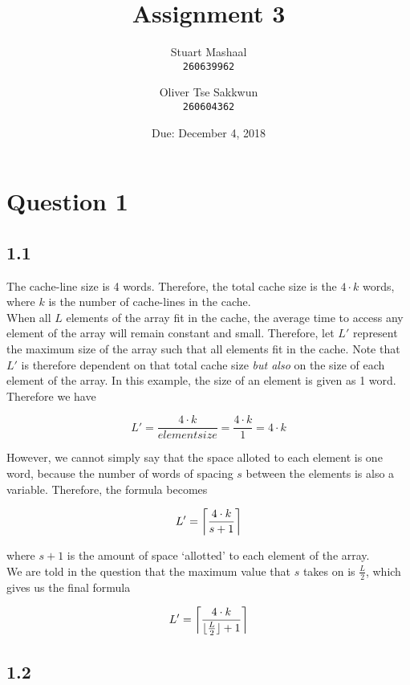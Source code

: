\documentclass[11pt, letterpaper]{article}
\title{Assignment 3}
\author{
    Stuart Mashaal\\
    \texttt{260639962}
    \and
    Oliver Tse Sakkwun\\
    \texttt{260604362}
}
\date{Due: December 4, 2018}
\DeclarePairedDelimiter{\ceil}{\lceil}{\rceil}
\DeclarePairedDelimiter{\floor}{\lfloor}{\rfloor}
\begin{document}
\begin{titlepage}
    \maketitle
    \thispagestyle{empty}
    \setcounter{page}{0}
\end{titlepage}

\section*{Question 1}
\label{sec:question_1}

\subsection*{1.1}
\label{sub:1_1}


The cache-line size is 4 words. Therefore, the total cache size is the $4 \cdot k$ words, where $k$ is the number of cache-lines in the cache.\\

When all $L$ elements of the array fit in the cache, the average time to access any element of the array will remain constant and small. Therefore, let $L'$ represent the maximum size of the array such that all elements fit in the cache. Note that $L'$ is therefore dependent on that total cache size \textit{but also} on the size of each element of the array. In this example, the size of an element is given as 1 word. Therefore we have

$$
L' = \frac{4 \cdot k}{\textit{elementsize}} = \frac{4 \cdot k}{1} = 4 \cdot k
$$

However, we cannot simply say that the space alloted to each element is one word, because the number of words of spacing $s$ between the elements is also a variable. Therefore, the formula becomes

$$
L' = \ceil[\bigg]{\frac{4 \cdot k}{s + 1}}
$$

where $s + 1$ is the amount of space `allotted' to each element of the array.\\

We are told in the question that the maximum value that $s$ takes on is $\frac{L}{2}$, which gives us the final formula

$$
L' = \ceil[\bigg]{\frac{4 \cdot k}{\floor{\frac{L}{2}} + 1}}
$$

\subsection*{1.2}
\label{sub:1_2}
\end{document}
